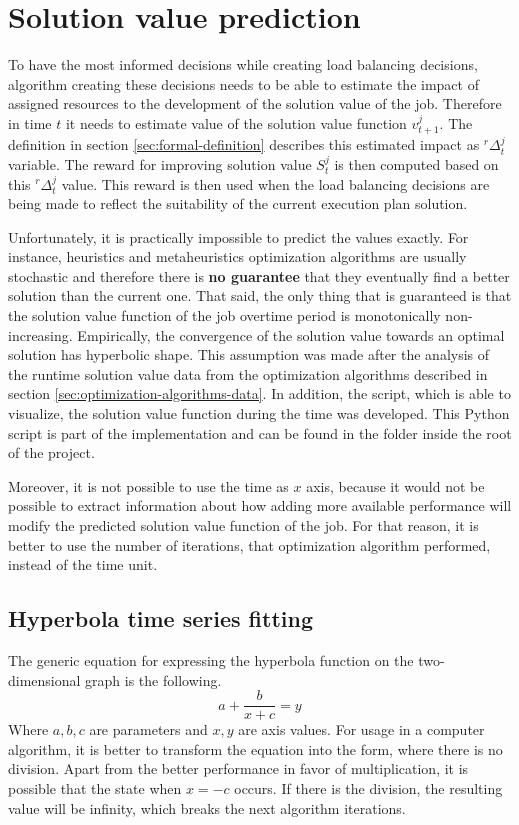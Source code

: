 \section{Solution value prediction}\label{sec:algorithm-value-prediction}

To have the most informed decisions while creating load balancing decisions,
algorithm creating these decisions needs to be able to estimate the impact of assigned resources to the development of the solution value of the job.
Therefore in time $t$ it needs to estimate value of the solution value function $v_{t+1}^{j}$.
The definition in section \ref{sec:formal-definition} describes this estimated impact as $^{r}\Delta_{t}^{j}$ variable.
The reward for improving solution value $S_{t}^{j}$ is then computed based on this $^{r}\Delta_{t}^{j}$ value.
This reward is then used when the load balancing decisions are being made to reflect the suitability of the current execution plan solution.

Unfortunately, 
it is practically impossible to predict the values exactly.
For instance, heuristics and metaheuristics optimization algorithms are usually stochastic 
and therefore there is \textbf{no guarantee} that they eventually find a better solution than the current one.
That said, 
the only thing that is guaranteed is that the solution value function of the job overtime period is monotonically non-increasing.
Empirically,
the convergence of the solution value towards an optimal solution has hyperbolic shape.
This assumption was made after the analysis of the runtime solution value data from the optimization algorithms described in section \ref{sec:optimization-algorithms-data}.
In addition, 
the script, which is able to visualize, the solution value function during the time was developed.
This Python script is part of the implementation and can be found in the  folder inside the root of the project.

Moreover, 
it is not possible to use the time as $x$ axis,
because it would not be possible to extract information about 
how adding more available performance will modify the predicted solution value function of the job.
For that reason,
it is better to use the number of iterations, that optimization algorithm performed,
instead of the time unit.

\subsection{Hyperbola time series fitting}
The generic equation for expressing the hyperbola function on the two-dimensional graph is the following.
\begin{equation}
    a + \dfrac{b}{x+c} = y
\end{equation}
Where $a,b,c$ are parameters and $x,y$ are axis values.
For usage in a computer algorithm,
it is better to transform the equation into the form, 
where there is no division.
Apart from the better performance in favor of multiplication\cite{LeFevre1999},
it is possible that the state when $x = -c$ occurs.
If there is the division,
the resulting value will be infinity,
which breaks the next algorithm iterations.

